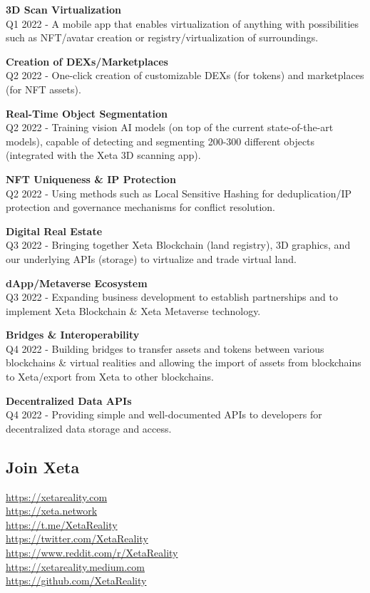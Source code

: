 \documentclass{article}
\begin{document}
\textbf{3D Scan Virtualization}\\
Q1 2022 - A mobile app that enables virtualization of anything with possibilities such as NFT/avatar creation or registry/virtualization of surroundings.
\bigskip

\textbf{Creation of DEXs/Marketplaces}\\
Q2 2022 - One-click creation of customizable DEXs (for tokens) and marketplaces (for NFT assets).
\bigskip

\textbf{Real-Time Object Segmentation}\\
Q2 2022 - Training vision AI models (on top of the current state-of-the-art models), capable of detecting and segmenting 200-300 different objects (integrated with the Xeta 3D scanning app).
\bigskip

\textbf{NFT Uniqueness \& IP Protection}\\
Q2 2022 - Using methods such as Local Sensitive Hashing for deduplication/IP protection and governance mechanisms for conflict resolution.
\bigskip

\textbf{Digital Real Estate}\\
Q3 2022 - Bringing together Xeta Blockchain (land registry), 3D graphics, and our underlying APIs (storage) to virtualize and trade virtual land.
\bigskip

\textbf{dApp/Metaverse Ecosystem}\\
Q3 2022 - Expanding business development to establish partnerships and to implement Xeta Blockchain \& Xeta Metaverse technology.
\bigskip

\textbf{Bridges \& Interoperability}\\
Q4 2022 - Building bridges to transfer assets and tokens between various blockchains \& virtual realities and allowing the import of assets from blockchains to Xeta/export from Xeta to other blockchains.
\bigskip

\textbf{Decentralized Data APIs}\\
Q4 2022 - Providing simple and well-documented APIs to developers for decentralized data storage and access.

\subsection{Join Xeta}

\url{https://xetareality.com}\\
\url{https://xeta.network}\\
\url{https://t.me/XetaReality}\\
\url{https://twitter.com/XetaReality}\\
\url{https://www.reddit.com/r/XetaReality}\\
\url{https://xetareality.medium.com}\\
\url{https://github.com/XetaReality}
\end{document}
